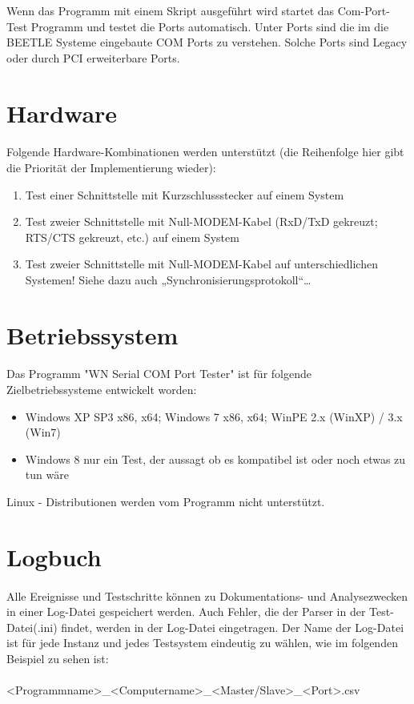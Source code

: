 Wenn das Programm mit einem Skript ausgeführt wird startet das Com-Port-Test Programm und testet die Ports automatisch. Unter Ports sind die im die BEETLE Systeme eingebaute COM Ports zu verstehen. Solche Ports sind Legacy oder durch PCI erweiterbare Ports.


\section{Hardware}
\paragraph{}
Folgende Hardware-Kombinationen werden unterstützt (die Reihenfolge hier gibt die Priorität der Implementierung wieder):
\begin{enumerate}
\item Test einer Schnittstelle mit Kurzschlussstecker auf einem System
\item Test zweier Schnittstelle mit Null-MODEM-Kabel (RxD/TxD gekreuzt; RTS/CTS gekreuzt, etc.) auf einem System
\item Test zweier Schnittstelle mit Null-MODEM-Kabel auf unterschiedlichen Systemen! Siehe dazu auch „Synchronisierungsprotokoll“…
\end{enumerate}



\section{Betriebssystem}
\paragraph{}
Das Programm "WN Serial COM Port Tester" ist für folgende Zielbetriebssysteme entwickelt worden:
\begin{itemize}
\item Windows XP SP3 x86, x64; Windows 7 x86, x64; WinPE 2.x (WinXP) / 3.x (Win7)
\item Windows 8 nur ein Test, der aussagt ob es kompatibel ist oder noch etwas zu tun wäre
\end{itemize}
Linux - Distributionen werden vom Programm nicht unterstützt.

\section{Logbuch}
\paragraph{}
Alle Ereignisse und Testschritte können zu Dokumentations- und Analysezwecken in einer Log-Datei gespeichert werden. Auch Fehler, die der Parser in der Test-Datei(.ini) findet, werden in der Log-Datei eingetragen. Der Name der Log-Datei ist für jede Instanz und jedes Testsystem eindeutig zu wählen, wie im folgenden Beispiel zu sehen ist:
\\
\\ \hspace*{10mm}<Programmname>\_<Computername>\_<Master/Slave>\_<Port>.csv

